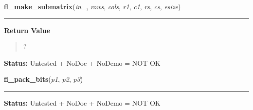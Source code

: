     \label{xformslib:library:fl_make_submatrix}

    \vspace{0.5ex}

\hspace{.8\funcindent}\begin{boxedminipage}{\funcwidth}

    \raggedright \textbf{fl\_make\_submatrix}(\textit{in\_}, \textit{rows}, \textit{cols}, \textit{r1}, \textit{c1}, \textit{rs}, \textit{cs}, \textit{esize})

    \vspace{-1.5ex}

    \rule{\textwidth}{0.5\fboxrule}
\setlength{\parskip}{2ex}
\setlength{\parskip}{1ex}
      \textbf{Return Value}
    \vspace{-1ex}

      \begin{quote}
      ?

      \end{quote}

\textbf{Status:} Untested + NoDoc + NoDemo = NOT OK



    \end{boxedminipage}

    \label{xformslib:library:fl_pack_bits}

    \vspace{0.5ex}

\hspace{.8\funcindent}\begin{boxedminipage}{\funcwidth}

    \raggedright \textbf{fl\_pack\_bits}(\textit{p1}, \textit{p2}, \textit{p3})

    \vspace{-1.5ex}

    \rule{\textwidth}{0.5\fboxrule}
\setlength{\parskip}{2ex}
\setlength{\parskip}{1ex}
\textbf{Status:} Untested + NoDoc + NoDemo = NOT OK



    \end{boxedminipage}

    \label{xformslib:library:fl_unpack_bits}

